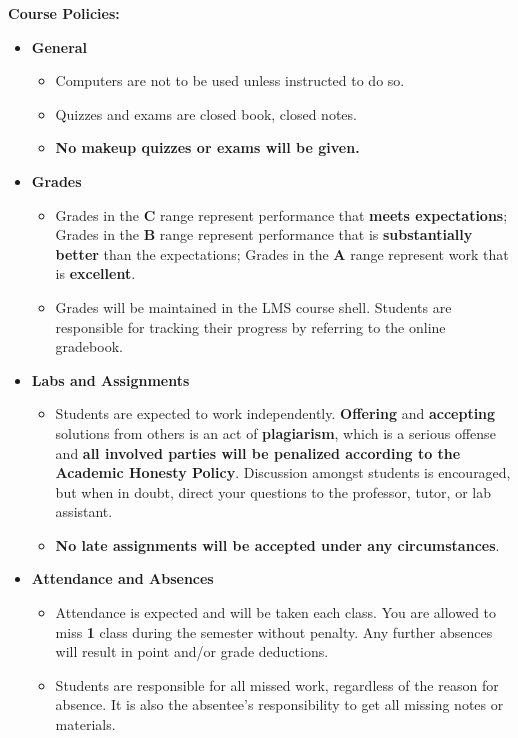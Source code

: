 \documentclass[11pt]{article}
\begin{document}
\textbf {\large Course Policies:}
\begin{itemize}
    \item \textbf {General}
        \begin{itemize}
            \item Computers are not to be used unless instructed to do so.
            \item Quizzes and exams are closed book, closed notes.
            \item \textbf {No makeup quizzes or exams will be given.}
        \end{itemize}
    \item \textbf {Grades}
        \begin{itemize}
            \item Grades in the \textbf{C} range represent performance that \textbf{meets expectations}; Grades in the \textbf{B} range represent performance that is \textbf{substantially better} than the expectations; Grades in the \textbf{A} range represent work that is \textbf{excellent}.
            \item Grades will be maintained in the LMS course shell. Students are responsible for tracking their progress by referring to the online gradebook.
        \end{itemize}
    \item \textbf {Labs and Assignments}
        \begin{itemize}
            \item Students are expected to work independently. \textbf{Offering} and \textbf{accepting} solutions from others is an act of \textbf{plagiarism}, which is a serious offense and \textbf{all involved parties will be penalized according to the Academic Honesty Policy}. Discussion amongst students is encouraged, but when in doubt, direct your questions to the professor, tutor, or lab assistant.
            \item \textbf{No late assignments will be accepted under any circumstances}.
        \end{itemize}
    \item \textbf{Attendance and Absences}
        \begin{itemize}
            \item Attendance is expected and will be taken each class. You are allowed to miss \textbf{1} class during the semester without penalty. Any further absences will result in point and/or grade deductions.
            \item Students are responsible for all missed work, regardless of the reason for absence. It is also the absentee's responsibility to get all missing notes or materials.
        \end{itemize}
\end{itemize}
\end{document}
